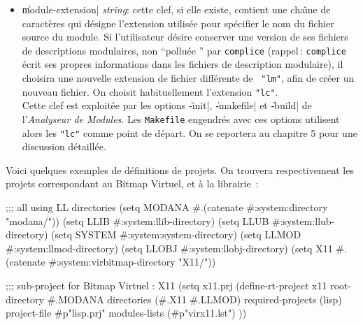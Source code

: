 \begin{itemize}
On \'{e}tudiera \'{e}galement les clefs \|modules| et \|modules-files| pour
g\'{e}rer compl\`{e}tement les noms des fichiers.

\begin{Side}{\bf Remarque}
Si aucun des fichiers 
sp\'{e}cifi\'{e}s avec la clef \|modules-list| ne figure dans un r\'{e}pertoire
donn\'{e} par la cl\'{e} \|directories| alors tous les 
modules de {\em ce r\'{e}pertoire} sont pris en compte pour construire
les tables d'analyse.
\end{Side}

\item {\Large \|module-extension| {\em string}}: cette clef, si
elle existe, 
contient une cha\^{\i}ne de caract\`{e}res qui
d\'{e}signe l'extension utilis\'{e}e pour sp\'{e}cifier le nom du fichier
source du module. Si l'utilisateur
d\'{e}sire conserver une version de ses fichiers de descriptions modulaires, non
``pollu\'{e}e {''} par {\tt complice} (rappel\,: {\tt complice} \'{e}crit ses
propres informations dans les fichiers de description modulaire), il
choisira une nouvelle extension de fichier diff\'{e}rente de {\tt
"lm"}, afin de cr\'{e}er un nouveau fichier. On choisit habituellement
l'extension {\tt "lc"}. \\
Cette clef est exploit\'{e}e par les options \|-init|, \|-makefile| et
\|-build| de l'{\em Analyseur de Modules}.
Les {\tt Makefile} engendr\'{e}s avec ces options utilisent alors
les {\tt "lc"} comme point de d\'{e}part. On se reportera au chapitre 5
pour une discussion d\'{e}taill\'{e}e.

\end{itemize}

Voici quelques exemples de d\'{e}finitions de projets. On trouvera 
respectivement les
projets correspondant au Bitmap Virtuel, et \`{a} la librairie \LeLisp\,:


\begin{Longcode*}
;;; all using LL directories
(setq MODANA #.(catenate #:system:directory "modana/"))
(setq LLIB   #:system:llib-directory)
(setq LLUB   #:system:llub-directory)
(setq SYSTEM #:system:system-directory)
(setq LLMOD  #:system:llmod-directory)
(setq LLOBJ  #:system:llobj-directory)
(setq X11    #.(catenate #:system:virbitmap-directory "X11/"))

;;; sub-project for Bitmap Virtuel : X11
(setq x11.prj
(define-rt-project x11
  root-directory \#.MODANA
  directories (\#.X11 \#.LLMOD)
  required-projects (lisp)
  project-file #p"lisp.prj"
  modules-lists (#p"virx11.lst")
))
\end{Longcode*}


